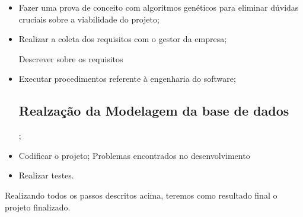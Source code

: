  \begin{itemize}

	\item Fazer uma prova de conceito com algoritmos genéticos para eliminar
	dúvidas cruciais sobre a viabilidade do projeto;
	  
	\item Realizar a coleta dos requisitos com o gestor da empresa;
	\par Descrever sobre os requisitos
	
	\item Executar procedimentos referente à engenharia do software;
	
	\subsection{Realzação da Modelagem da base de dados};
	
	
	\item Codificar o projeto;
	 Problemas encontrados no desenvolvimento

	\item Realizar testes.
	 
 \end{itemize}
 
 \par Realizando todos os passos descritos acima, teremos como resultado final o
 projeto finalizado.

\newpage


